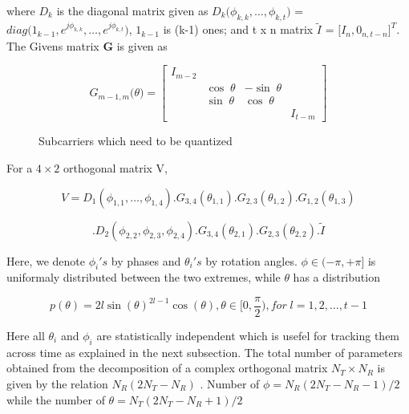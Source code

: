 \documentclass[conference]{IEEEtran}
\begin{document}
where $D_{k}$ is the diagonal matrix given as $D_{k}\big(\phi_{k,k}, \ldots, \phi_{k,t} \big)$ =  $diag\big( 1_{k-1}, e^{j\phi_{k,k}},\ldots, e^{j\phi_{k,t}}  \big)$, $1_{k-1}$ is (k-1) ones; and t x n matrix $\tilde{I}$ = $\big[I_{n}, 0_{n,t-n}\big]^{T}$. The Givens matrix \textbf{G} is given as

\begin{equation}
G_{m-1,m}\big(\theta\big)  =
\begin{bmatrix}

I_{m-2} & & & \\
& \cos\;\theta & - \sin\;\theta & \\
& \sin\;\theta & \cos\;\theta & \\
& & & I_{t-m}

\end{bmatrix}
\end{equation}


\begin{figure}
\label{adpm-fig}
\caption{Subcarriers which need to be quantized}
\label{ber_overvie}
\vspace{-5pt}
\end{figure}


For a $4 \times 2$ orthogonal matrix V,

$$V = D_{1}(\phi_{1,1},\ldots,\phi_{1,4}).G_{3,4}(\theta_{1,1}) .G_{2,3}(\theta_{1,2}) .G_{1,2}(\theta_{1,3})$$

\vspace{-1.4em}

\hspace{1pt}$$.D_{2}(\phi_{2,2},\phi_{2,3},\phi_{2,4}) .G_{3,4}(\theta_{2,1}) .G_{2,3}(\theta_{2,2}).\tilde{I}$$



Here, we denote $\phi_{i}'s$ by phases and $\theta_{i}'s$ by rotation angles. $\phi \in (-\pi, + \pi]$ is uniformaly distributed between the two extremes\cite{4114278}, while $\theta$ has a distribution

\begin{equation}
p(\theta) = 2l\sin(\theta)^{2l-1}\cos(\theta), \theta \in [0, \frac{\pi}{2}), for \; l = 1,2,\ldots,t-1
\end{equation}

Here all $\theta_i$ and $\phi_i$ are statistically independent which is usefel for tracking them across time as explained in the next subsection. The total number of parameters obtained from the decomposition of a complex orthogonal matrix $N_{T} \times N_{R} $ is given by the relation $N_{R}(2N_{T} - N_{R}) $ \cite{4114278}. Number of $\phi = N_{R}(2N_{T} - N_{R}-1)/2$ while the number of $\theta = N_{T}(2N_{T} - N_{R}+1)/2$
\end{document}
